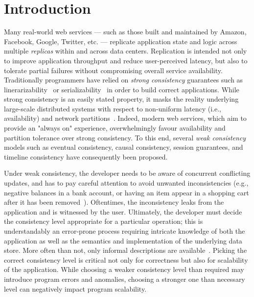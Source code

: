 \section{Introduction}

Many real-world web services --- such as those built and maintained by Amazon,
Facebook, Google, Twitter, etc. --- replicate application state and logic
across multiple \emph{replicas} within and across data centers. Replication is
intended not only to improve application throughput and reduce user-perceived
latency, but also to tolerate partial failures without compromising overall
service availability. Traditionally programmers have relied on \emph{strong
consistency} guarantees such as linerarizability~\cite{Herlihy1990} or
serializability~\cite{Serializability} in order to build correct applications.
While strong consistency is an easily stated property, it masks the reality
underlying large-scale distributed systems with respect to non-uniform latency
(i.e., availability) and network partitions~\cite{Brewer2000,Gilbert}. Indeed,
modern web services, which aim to provide an "always on" experience,
overwhelmingly favour availability and partition tolerance over strong
consistency. To this end, several \emph{weak consistency} models such as
eventual consistency, causal consistency, session guarantees, and timeline
consistency have consequently been proposed.

Under weak consistency, the developer needs to be aware of concurrent
conflicting updates, and has to pay careful attention to avoid unwanted
inconsistencies (e.g., negative balances in a bank account, or having an item
appear in a shopping cart after it has been removed~\cite{Dynamo}). Oftentimes,
the inconsistency leaks from the application and is witnessed by the user.
Ultimately, the developer must decide the consistency level appropriate for a
particular operation; this is understandably an error-prone process requiring
intricate knowledge of both the application as well as the semantics and
implementation of the underlying data store.  More often than not, only
informal descriptions are available~\cite{}.  Picking the correct consistency
level is critical not only for correctness but also for scalability of the
application. While choosing a weaker consistency level than required may
introduce program errors and anomalies, choosing a stronger one than necessary
level can negatively impact program scalability.



